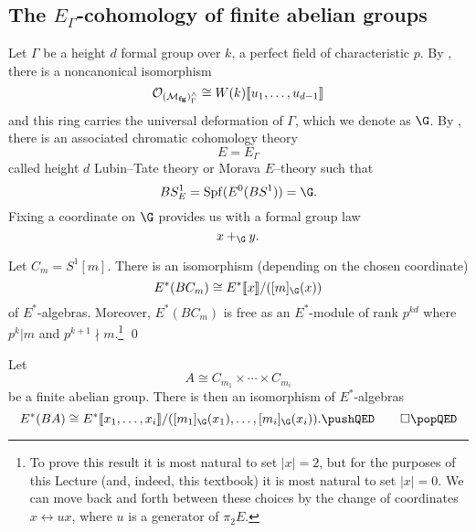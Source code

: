 
\subsection*{The $E_{\Gamma}$-cohomology of finite abelian groups}



Let $\Gamma$ be a height $d$ formal group over $k$, a perfect field of characteristic $p$. By , there is a noncanonical isomorphism 
\[
\mathcal{O}_{(\mathcal{M}_{\mathbf{fg}})^\wedge_\Gamma} \cong W(k)\llbracket{u_1, \ldots, u_{d-1}}\rrbracket
\] 
and this ring carries the universal deformation of $\Gamma$, which we denote as $\G$. By , there is an associated chromatic cohomology theory
\[
E = E_{\Gamma}
\]
called height $d$ Lubin--Tate theory or Morava $E$--theory such that
\[
BS^1_E = \Spf(E^0(BS^1)) = \G.
\]
Fixing a coordinate on $\G$ provides us with a formal group law
\[
x +_{\G} y.
\]

\begin{proposition} \label{app:cyclic}
Let $C_{m} = S^1[m]$. There is an isomorphism (depending on the chosen coordinate) 
\[
E^*(BC_{m}) \cong E^*\ps{x}/([m]_{\G}(x))
\]
of $E^*$-algebras. Moreover, $E^*(BC_{m})$ is free as an $E^*$-module of rank $p^{kd}$ where $p^k|m$ and $p^{k+1} \nmid m$.\footnote{To prove this result it is most natural to set $|x| = 2$, but for the purposes of this Lecture (and, indeed, this textbook) it is most natural to set $|x| = 0$. We can move back and forth between these choices by the change of coordinates $x \leftrightarrow ux$, where $u$ is a generator of $\pi_2 E$.} \pushQED\qed \qedhere \popQED
\end{proposition}

\begin{corollary} \label{app:ab}
Let 
\[
A \cong C_{m_1} \times \cdots \times C_{m_i}
\]
be a finite abelian group.  There is then an isomorphism of $E^*$-algebras
\[
E^*(BA) \cong E^*\ps{x_1, \ldots, x_{i}}/([m_1]_{\G}(x_1), \ldots, [m_i]_{\G}(x_i)). \pushQED\qed \qedhere \popQED
\]
\end{corollary}


